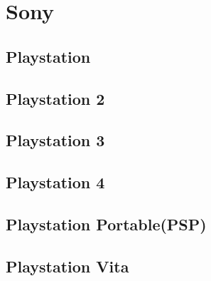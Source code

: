 \section{Sony}

\subsection{Playstation}
\subsection{Playstation 2}
\subsection{Playstation 3}
\subsection{Playstation 4}
\subsection{Playstation Portable(PSP)}
\subsection{Playstation Vita}
